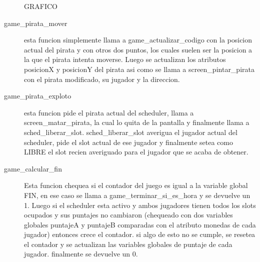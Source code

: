 \begin{description}
GRAFICO

\item[game_pirata_mover]
  esta funcion simplemente llama a game_actualizar_codigo con la posicion actual del pirata y con otros dos puntos,
  los cuales suelen ser la posicion a la que el pirata intenta moverse.
  Luego se actualizan los atributos posicionX y posicionY del pirata asi como se llama a screen_pintar_pirata con el
  pirata modificado, su jugador y la direccion.

\item[game_pirata_exploto]
  esta funcion pide el pirata actual del scheduler, llama a screen_matar_pirata, la cual lo quita de la pantalla y
  finalmente llama a sched_liberar_slot.
  sched_liberar_slot averigua el jugador actual del scheduler, pide el slot actual de ese jugador y finalmente
  setea como LIBRE el slot recien averiguado para el jugador que se acaba de obtener.

\item[game_calcular_fin]
  Esta funcion chequea si el contador del juego es igual a la variable global FIN, en ese caso se llama a game_terminar_si_es_hora
  y se devuelve un 1.
  Luego si el scheduler esta activo y ambos jugadores tienen todos los slots ocupados y sus puntajes no cambiaron
  (chequeado con dos variables globales puntajeA y puntajeB comparadas con el atributo monedas de cada jugador)
  entonces crece el contador.
  si algo de esto no se cumple, se resetea el contador y se actualizan las variables globales de puntaje de cada jugador.
  finalmente se devuelve un 0.

\end{description}
